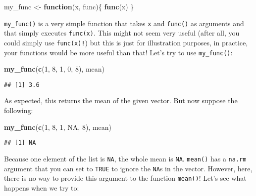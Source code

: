 \documentclass[
]{article}
\newenvironment{Shaded}{\begin{snugshade}}{\end{snugshade}}
\newcommand{\ControlFlowTok}[1]{\textcolor[rgb]{0.13,0.29,0.53}{\textbf{#1}}}
\newcommand{\DecValTok}[1]{\textcolor[rgb]{0.00,0.00,0.81}{#1}}
\newcommand{\KeywordTok}[1]{\textcolor[rgb]{0.13,0.29,0.53}{\textbf{#1}}}
\newcommand{\NormalTok}[1]{#1}
\newcommand{\OtherTok}[1]{\textcolor[rgb]{0.56,0.35,0.01}{#1}}
\newcommand{\StringTok}[1]{\textcolor[rgb]{0.31,0.60,0.02}{#1}}
\begin{document}
\begin{Shaded}
\begin{Highlighting}[]
\NormalTok{my\_func \textless{}{-}}\StringTok{ }\ControlFlowTok{function}\NormalTok{(x, func)\{}
  \KeywordTok{func}\NormalTok{(x)}
\NormalTok{\}}
\end{Highlighting}
\end{Shaded}

\texttt{my\_func()} is a very simple function that takes \texttt{x} and \texttt{func()} as arguments and that simply
executes \texttt{func(x)}. This might not seem very useful (after all, you could simply use \texttt{func(x)!}) but
this is just for illustration purposes, in practice, your functions would be more useful than that!
Let's try to use \texttt{my\_func()}:

\begin{Shaded}
\begin{Highlighting}[]
\KeywordTok{my\_func}\NormalTok{(}\KeywordTok{c}\NormalTok{(}\DecValTok{1}\NormalTok{, }\DecValTok{8}\NormalTok{, }\DecValTok{1}\NormalTok{, }\DecValTok{0}\NormalTok{, }\DecValTok{8}\NormalTok{), mean)}
\end{Highlighting}
\end{Shaded}

\begin{verbatim}
## [1] 3.6
\end{verbatim}

As expected, this returns the mean of the given vector. But now suppose the following:

\begin{Shaded}
\begin{Highlighting}[]
\KeywordTok{my\_func}\NormalTok{(}\KeywordTok{c}\NormalTok{(}\DecValTok{1}\NormalTok{, }\DecValTok{8}\NormalTok{, }\DecValTok{1}\NormalTok{, }\OtherTok{NA}\NormalTok{, }\DecValTok{8}\NormalTok{), mean)}
\end{Highlighting}
\end{Shaded}

\begin{verbatim}
## [1] NA
\end{verbatim}

Because one element of the list is \texttt{NA}, the whole mean is \texttt{NA}. \texttt{mean()} has a \texttt{na.rm} argument
that you can set to \texttt{TRUE} to ignore the \texttt{NA}s in the vector. However, here, there is no way to
provide this argument to the function \texttt{mean()}! Let's see what happens when we try to:
\end{document}
